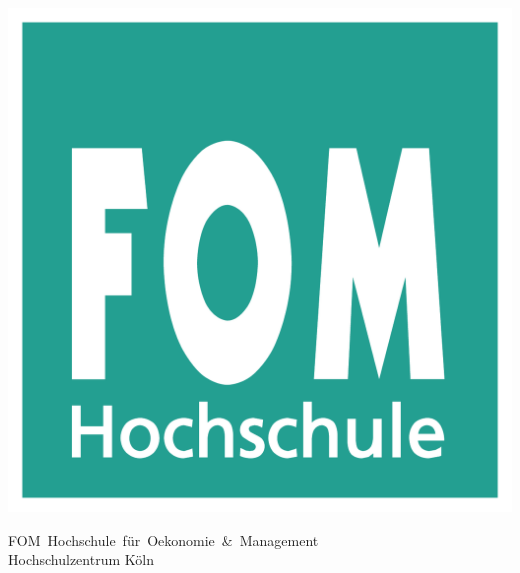 \begin{titlepage}
    \noindent\begin{minipage}[c][.18\textwidth][t]{.18\textwidth}
        \flushleft
        \includegraphics[width=\linewidth]{fom_logo.pdf}
    \end{minipage}%
    \hfill
    \begin{minipage}[c][.18\textwidth][b]{.9\textwidth}
        \rmfamily
        {\large {FOM}~Hochschule~für~Oekonomie~\&~Management} \\
        {\large Hochschulzentrum Köln}
        \vspace{0.25cm}
    \end{minipage}

    \begin{flushleft}
        
        \vspace{2.0cm}

        {
            \rmfamily\Large
            \texplatetype\\
            \rmfamily\normalsize
            \textit{\texplatemodule}\\
        }


\end{flushleft}
\end{titlepage}

